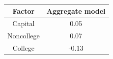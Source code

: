 \begin{table}[!ht]
\setlength\tabcolsep{0.425em}
\setlength\aboverulesep{0pt}
\setlength\belowrulesep{0.2em}
\centering
\begin{threeparttable}
\begin{tabular}{cc}
\toprule[0.1em]
Factor & Aggregate model \\[0.2em]
\midrule[0.075em]
Capital & 0.05 \\[0.2em]
Noncollege & 0.07 \\[0.2em]
College & -0.13 \\[0.2em]
\bottomrule[0.1em]
\end{tabular}
\end{threeparttable}
\end{table}

